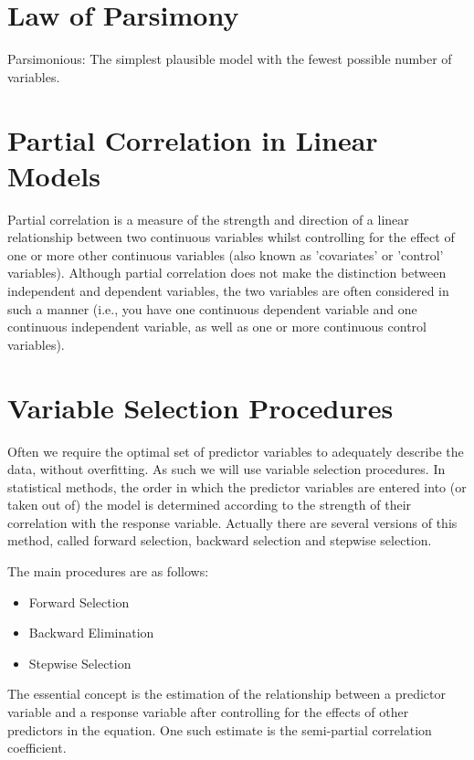 \documentclass[a4paper,12pt]{article}
\begin{document}
	
\tableofcontents

\newpage

\section{Law of Parsimony}
Parsimonious: The simplest plausible model with the fewest possible number of variables.


\section{Partial Correlation in Linear Models}
Partial correlation is a measure of the strength and direction of a linear relationship between two continuous variables whilst controlling for the effect of one or more other continuous variables (also known as 'covariates' or 'control' variables). Although partial correlation does not make the distinction between independent and dependent variables, the two variables are often considered in such a manner (i.e., you have one continuous dependent variable and one continuous independent variable, as well as one or more continuous control variables).


\section{Variable Selection Procedures}
Often we require the optimal set of predictor variables to adequately describe the data, without overfitting. As such we will use variable selection procedures. In statistical methods, the order in which the predictor variables are entered into (or taken out of) the model is determined according to the strength of their correlation with the response variable. Actually there are several versions of this method, called forward selection, backward selection and stepwise selection.\\
\begin{framed}
\noindent The main procedures are as follows:
\begin{itemize}
	\item Forward Selection
	\item Backward Elimination
	\item Stepwise Selection
\end{itemize}
\end{framed}
The essential concept is the estimation of the relationship between a predictor
variable and a response variable after controlling for the effects of other
predictors in the equation. One such estimate is the semi-partial correlation coefficient.
\end{document}
